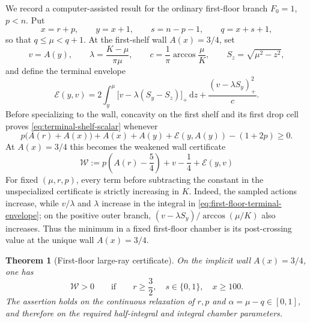 \documentclass[11pt]{article}
\newtheorem{theorem}{Theorem}[section]
\theoremstyle{remark}
\newcommand{\dd}{\,\mathrm d}
\begin{document}
We record a computer-assisted result for the ordinary first-floor branch
$F_0=1$, $p<n$.  Put
\[
 x=r+p,\qquad y=x+1,\qquad s=n-p-1,\qquad q=x+s+1,
\]
so that $q\leq\mu<q+1$.  At the first-shelf wall $A(x)=3/4$, set
\[
 v=A(y),\qquad
 \lambda=\frac{K-\mu}{\pi\mu},\qquad
 c=\frac1\pi\arccos\frac\mu K,\qquad
 S_z=\sqrt{\mu^2-z^2},
\]
and define the terminal envelope
\begin{equation}
 \mathcal E(y,v)=
 2\int_y^\mu\bigl[v-\lambda(S_y-S_z)\bigr]_+\dd z
 +\frac{(v-\lambda S_y)_+^2}{c}.
 \label{eq:first-floor-terminal-envelope}
\end{equation}
Before specializing to the wall, concavity on the first shelf and its first
drop cell proves \eqref{eq:terminal-shelf-scalar} whenever
\[
 p\bigl(A(r)+A(x)\bigr)+A(x)+A(y)+\mathcal E(y,A(y))-(1+2p)\geq0.
\]
At $A(x)=3/4$ this becomes the weakened wall certificate
\begin{equation}
 \mathcal W:=p\left(A(r)-\frac54\right)+v-\frac14
 +\mathcal E(y,v)
 \label{eq:first-floor-weakened-certificate}
\end{equation}
For fixed $(\mu,r,p)$, every term before subtracting the constant in the
unspecialized certificate is strictly increasing in $K$.  Indeed, the
sampled actions increase, while $v/\lambda$ and $\lambda$ increase in the
integral in \eqref{eq:first-floor-terminal-envelope}; on the positive outer
branch, $(v-\lambda S_y)/\arccos(\mu/K)$ also increases.  Thus the minimum
in a fixed first-floor chamber is its post-crossing value at the unique wall
$A(x)=3/4$.

\begin{theorem}[First-floor large-ray certificate]
\label{thm:first-floor-large-ray}
On the implicit wall $A(x)=3/4$, one has
\begin{equation}
 \boxed{\mathcal W>0}
 \qquad\text{if}\qquad
 r\geq\frac32,\quad s\in\{0,1\},\quad x\geq100.
 \label{eq:first-floor-large-ray}
\end{equation}
The assertion holds on the continuous relaxation of $r,p$ and
$\alpha=\mu-q\in[0,1]$, and therefore on the required half-integral and
integral chamber parameters.
\end{theorem}
\end{document}

